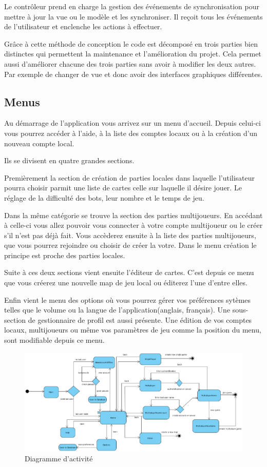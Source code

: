 	Le contrôleur prend en charge la gestion des événements de synchronisation 
	pour mettre à jour la vue ou le modèle et les synchroniser.
	Il reçoit tous les événements de l'utilisateur et enclenche les actions 
	à effectuer.
			
	Grâce à cette méthode de conception le code est décomposé en trois parties 
	bien distinctes qui permettent la maintenance et l'amélioration du projet.
	Cela permet aussi d'améliorer chacune des trois parties sans avoir à 
	modifier les deux autres.
	Par exemple de changer de vue et donc avoir des interfaces graphiques différentes.
			
\subsection{Menus}

	Au démarrage de l'application vous arrivez sur un menu d'accueil. Depuis
	celui-ci vous pourrez accéder à l'aide, à la liste des comptes locaux ou à la
	création d'un nouveau compte local.
	
	Ils se divisent en quatre grandes sections.
		
	Premièrement la section de création de parties locales dans laquelle l'utilisateur
	pourra choisir parmit une liste de cartes celle sur laquelle il désire jouer.
	Le réglage de la difficulté des \glspl{bot}, leur nombre et le temps de jeu.
		
	Dans la même catégorie se trouve la section des parties multijoueurs. En
	accédant à celle-ci vous allez pouvoir vous connecter à votre compte
	multijoueur ou le créer s'il n'est pas déjà fait. Vous accèderez ensuite à la liste
	des parties multijoueurs, que vous pourrez rejoindre ou choisir de créer la
	votre. Dans le menu création le principe est proche des parties locales.
		
	Suite à ces deux sections vient ensuite l'éditeur de cartes.
	C'est depuis ce menu que vous créerez une nouvelle map de jeu local ou 
	éditerez l'une d'entre elles.
		
	Enfin vient le menu des options où vous pourrez gérer vos
	préférences sytèmes telles que le volume ou la langue de
	l'application(anglais, français).
	Une sous-section de gestionnaire de profil est aussi présente.
	Une édition de vos comptes locaux, multijoueurs ou même
	vos paramètres de jeu comme la position du menu, sont modifiable depuis ce 
	menu.
	
	\begin{figure}
		\label{activité}
		\includegraphics[width=23cm, angle=90]{Analyse/Img/diag_activity.eps}
		\caption{Diagramme d'activité}
	\end{figure}

